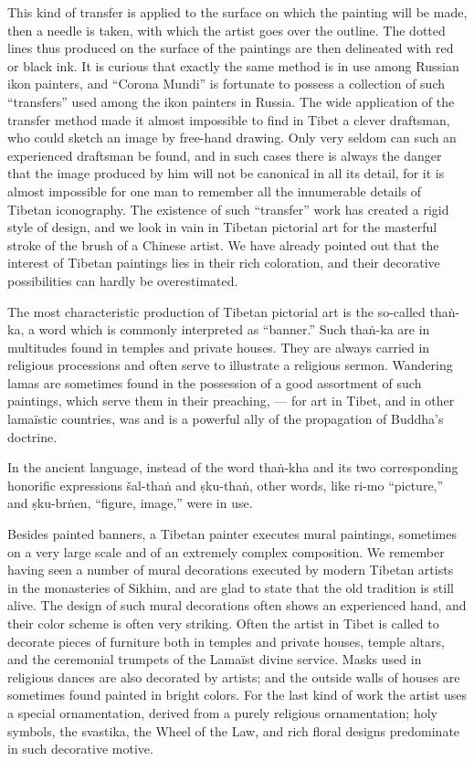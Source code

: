 \documentclass[a4paper, 12pt, oneside]{article}
\begin{document}
This kind of transfer is applied to the surface on which the painting will be made, then a needle is taken, with which the artist goes over the outline. The dotted lines thus produced on the surface of the paintings are then delineated with red or black ink. It is curious that exactly the same method is in use among Russian ikon painters, and ``Corona Mundi'' is fortunate to possess a collection of such ``transfers'' used among the ikon painters in Russia. The wide application of the transfer method made it almost impossible to find in Tibet a clever draftsman, who could sketch an image by free-hand drawing. Only very seldom can such an experienced draftsman be found, and in such cases there is always the danger that the image produced by him will not be canonical in all its detail, for it is almost impossible for one man to remember all the innumerable details of Tibetan iconography. The existence of such ``transfer'' work has created a rigid style of design, and we look in vain in Tibetan pictorial art for the masterful stroke of the brush of a Chinese artist. We have already pointed out that the interest of Tibetan paintings lies in their rich coloration, and their decorative possibilities can hardly be overestimated.

The most characteristic production of Tibetan pictorial art is the so-called tha\.{n}-ka, a word which is commonly interpreted as ``banner.'' Such tha\.{n}-ka are in multitudes found in temples and private houses. They are always carried in religious processions and often serve to illustrate a religious sermon. Wandering lamas are sometimes found in the possession of a good assortment of such paintings, which serve them in their preaching, --- for art in Tibet, and in other lamaïstic countries, was and is a powerful ally of the propagation of Buddha's doctrine.

In the ancient language, instead of the word tha\.{n}-kha and its two corresponding honorific expressions šal-tha\.{n} and \d{s}ku-tha\.{n}, other words, like ri-mo ``picture,'' and \d{s}ku-br\.{n}en, ``figure, image,'' were in use. 

Besides painted banners, a Tibetan painter executes mural paintings, sometimes on a very large scale and of an extremely complex composition. We remember having seen a number of mural decorations executed by modern Tibetan artists in the monasteries of Sikhim, and are glad to state that the old tradition is still alive. The design of such mural decorations often shows an experienced hand, and their color scheme is often very striking. Often the artist in Tibet is called to decorate pieces of furniture both in temples and private houses, temple altars, and the ceremonial trumpets of the Lamaïst divine service. Masks used in religious dances are also decorated by artists; and the outside walls of houses are sometimes found painted in bright colors. For the last kind of work the artist uses a special ornamentation, derived from a purely religious ornamentation; holy symbols, the svastika, the Wheel of the Law, and rich floral designs predominate in such decorative motive.
\end{document}
